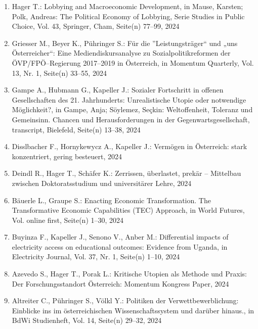 \begin{enumerate}
	 \item Hager T.: Lobbying and Macroeconomic Development, in Mause, Karsten; Polk, Andreas: The Political Economy of Lobbying, Serie Studies in Public Choice, Vol. 43, Springer, Cham, Seite(n) 77--99, 2024
	 \item Griesser M., Beyer K., Pühringer S.: Für die ''Leistungsträger“ und „uns Österreicher“: Eine Mediendiskursanalyse zu Sozialpolitikreformen der ÖVP/FPÖ--Regierung 2017–2019 in Österreich, in Momentum Quarterly, Vol. 13, Nr. 1, Seite(n) 33--55, 2024
	 \item Gampe A., Hubmann G., Kapeller J.: Sozialer Fortschritt in offenen Gesellschaften des 21. Jahrhunderts: Unrealistische Utopie oder notwendige Möglichkeit?, in Gampe, Anja; Söylemez, Seçkin: Weltoffenheit, Toleranz und Gemeinsinn. Chancen und Herausforderungen in der Gegenwartsgesellschaft, transcript, Bielefeld, Seite(n) 13--38, 2024
	 \item Disslbacher F., Hornykewycz A., Kapeller J.: Vermögen in Österreich: stark konzen­triert, gering be­steuert, 2024
	 \item Deindl R., Hager T., Schäfer K.: Zerrissen, überlastet, prekär – Mittelbau zwischen Doktoratsstudium und universitärer Lehre, 2024
	 \item Bäuerle L., Graupe S.: Enacting Economic Transformation. The Transformative Economic Capabilities (TEC) Approach, in World Futures, Vol. online first, Seite(n) 1--30, 2024
	 \item Buyinza F., Kapeller J., Senono V., Anber M.: Differential impacts of electricity access on educational outcomes: Evidence from Uganda, in Electricity Journal, Vol. 37, Nr. 1, Seite(n) 1--10, 2024
	 \item Azevedo S., Hager T., Porak L.: Kritische Utopien als Methode und Praxis: Der Forschungsstandort Österreich: Momentum Kongress Paper, 2024
	 \item Altreiter C., Pühringer S., Völkl Y.: Politiken der Verwettbewerblichung: Einblicke ins im österreichischen Wissenschaftssystem und darüber hinaus., in BdWi Studienheft, Vol. 14, Seite(n) 29--32, 2024
\end{enumerate}
